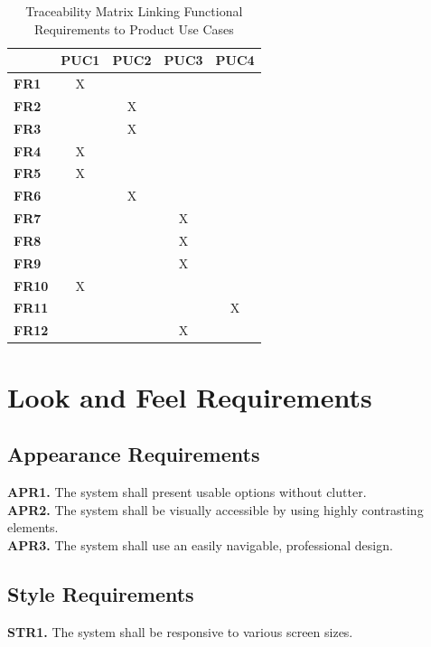 \documentclass[12pt]{article}
\begin{document}
\begin{table}[ht]
  \centering
  \begin{tabular}{|l|c|c|c|c|}
  \hline
  \textbf{} & \textbf{PUC1} & \textbf{PUC2} & \textbf{PUC3} & \textbf{PUC4} \\
  \hline
  \textbf{FR1}  & X &   &   &   \\ \hline
  \textbf{FR2}  &   & X &   &   \\ \hline
  \textbf{FR3}  &   & X &   &   \\ \hline
  \textbf{FR4}  & X &   &   &   \\ \hline
  \textbf{FR5}  & X &   &   &   \\ \hline
  \textbf{FR6}  &   & X &   &   \\ \hline
  \textbf{FR7}  &   &   & X &   \\ \hline
  \textbf{FR8}  &   &   & X &   \\ \hline
  \textbf{FR9}  &   &   & X &   \\ \hline
  \textbf{FR10} & X &   &   &   \\ \hline
  \textbf{FR11} &   &   &   & X \\ \hline
  \textbf{FR12} &   &   & X &   \\ \hline
  \end{tabular}
  \caption{Traceability Matrix Linking Functional Requirements to Product Use Cases}
  \label{tab:traceability}
  \end{table}

\vspace{10pt}

\section{Look and Feel Requirements}
\subsection{Appearance Requirements}
\textbf{APR1.} The system shall present usable options without clutter. \\
\textbf{APR2.} The system shall be visually accessible by using highly contrasting elements. \\
\textbf{APR3.} The system shall use an easily navigable, professional design.
\subsection{Style Requirements}
\textbf{STR1.} The system shall be responsive to various screen sizes.
\end{document}
